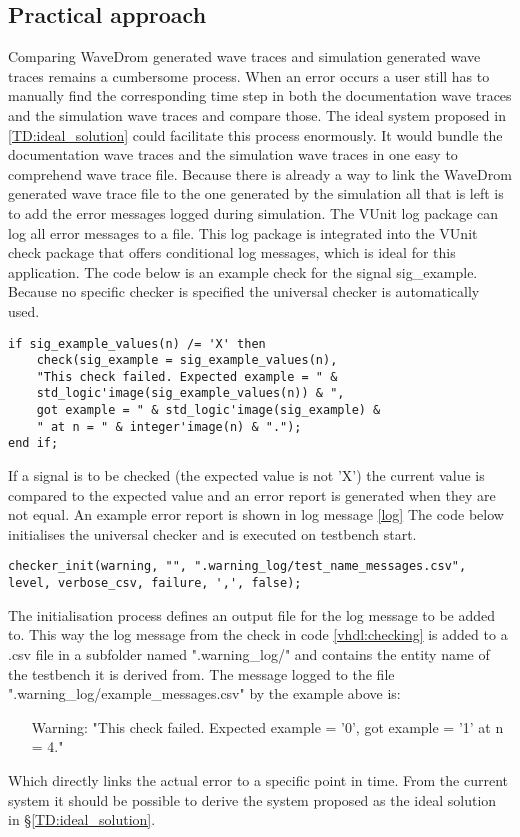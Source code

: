 \subsection{Practical approach}
Comparing WaveDrom generated wave traces and simulation generated wave traces remains a cumbersome process. When an error occurs a user still has to manually find the corresponding time step in both the documentation wave traces and the simulation wave traces and compare those.
\npar
The ideal system proposed in \ref{TD:ideal_solution} could facilitate this process enormously. It would bundle the documentation wave traces and the simulation wave traces in one easy to comprehend wave trace file.
\npar
Because there is already a way to link the WaveDrom generated wave trace file to the one generated by the simulation all that is left is to add the error messages logged during simulation. The VUnit log package can log all error messages to a file. This log package is integrated into the VUnit check package that offers conditional log messages, which is ideal for this application. The code below is an example check for the signal sig\_example. Because no specific checker is specified the universal checker is automatically used.
\begin{lstlisting}[style=vhdl, caption={Signal checking in VHDL}, label={vhdl:checking}]
if sig_example_values(n) /= 'X' then
	check(sig_example = sig_example_values(n),  
	"This check failed. Expected example = " &
	std_logic'image(sig_example_values(n)) & ", 
	got example = " & std_logic'image(sig_example) & 
	" at n = " & integer'image(n) & ".");
end if;
\end{lstlisting}\nline
If a signal is to be checked (the expected value is not 'X') the current value is compared to the expected value and an error report is generated when they are not equal. An example error report is shown in log message \ref{log} The code below initialises the universal checker and is executed on testbench start.
\begin{lstlisting}[style=vhdl, caption={}, label={vhdl:checker_init}]
checker_init(warning, "", ".warning_log/test_name_messages.csv", level, verbose_csv, failure, ',', false);
\end{lstlisting}\nline
The initialisation process defines an output file for the log message to be added to. This way the log message from the check in code \ref{vhdl:checking} is added to a .csv file in a subfolder named ".warning\_log/" and contains the entity name of the testbench it is derived from.
The message logged to the file ".warning\_log/example\_messages.csv" by the example above is:
\begin{customenv}\label{error_message}
	\begin{itemize}
		\item [Warning:] "This check failed. Expected example = '0', got example = '1' at n = 4."
	\end{itemize}
\end{customenv}\nline
Which directly links the actual error to a specific point in time. From the current system it should be possible to derive the system proposed as the ideal solution in §\ref{TD:ideal_solution}.

